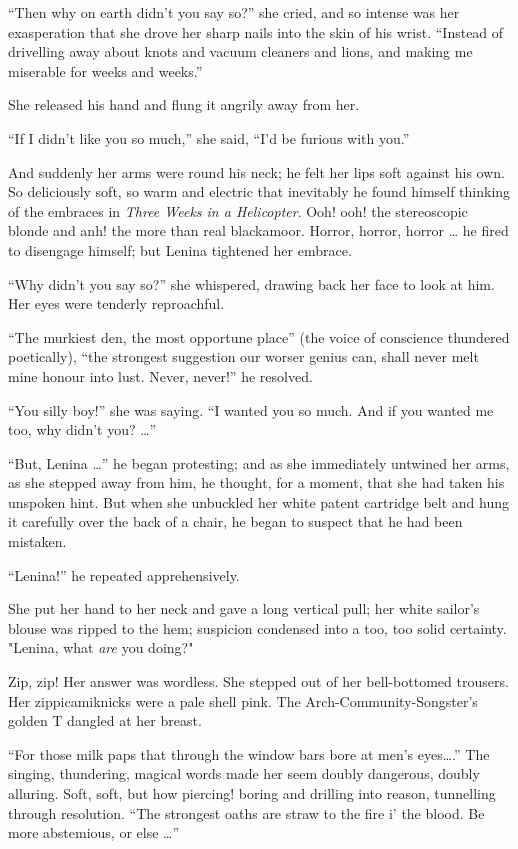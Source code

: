 \documentclass[12pt]{report}
\begin{document}
``Then why on earth didn't you say so?'' she cried, and so intense was
her exasperation that she drove her sharp nails into the skin of his
wrist. ``Instead of drivelling away about knots and vacuum cleaners and
lions, and making me miserable for weeks and weeks.''

She released his hand and flung it angrily away from her.

``If I didn't like you so much,'' she said, ``I'd be furious with you.''

And suddenly her arms were round his neck; he felt her lips soft against
his own. So deliciously soft, so warm and electric that inevitably he
found himself thinking of the embraces in \emph{Three Weeks in a
Helicopter}. Ooh! ooh! the stereoscopic blonde and anh! the more than
real blackamoor. Horror, horror, horror \ldots{} he fired to disengage
himself; but Lenina tightened her embrace.

``Why didn't you say so?'' she whispered, drawing back her face to look
at him. Her eyes were tenderly reproachful.

``The murkiest den, the most opportune place'' (the voice of conscience
thundered poetically), ``the strongest suggestion our worser genius can,
shall never melt mine honour into lust. Never, never!'' he resolved.

``You silly boy!'' she was saying. ``I wanted you so much. And if you
wanted me too, why didn't you? \ldots{}''

``But, Lenina \ldots{}'' he began protesting; and as she immediately
untwined her arms, as she stepped away from him, he thought, for a
moment, that she had taken his unspoken hint. But when she unbuckled her
white patent cartridge belt and hung it carefully over the back of a
chair, he began to suspect that he had been mistaken.

``Lenina!'' he repeated apprehensively.

She put her hand to her neck and gave a long vertical pull; her white
sailor's blouse was ripped to the hem; suspicion condensed into a too,
too solid certainty. "Lenina, what \emph{are} you doing?"

Zip, zip! Her answer was wordless. She stepped out of her bell-bottomed
trousers. Her zippicamiknicks were a pale shell pink. The
Arch-Community-Songster's golden T dangled at her breast.

``For those milk paps that through the window bars bore at men's
eyes\ldots{}.'' The singing, thundering, magical words made her seem
doubly dangerous, doubly alluring. Soft, soft, but how piercing! boring
and drilling into reason, tunnelling through resolution. ``The strongest
oaths are straw to the fire i' the blood. Be more abstemious, or else
\ldots{}''
\end{document}
